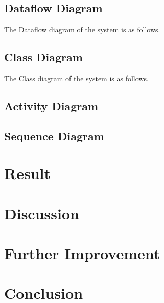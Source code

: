 \documentclass[a4paper,12pt,onepage]{article}
\begin{document}
\newpage
\subsection{Dataflow Diagram}
The Dataflow diagram of the system is as follows.

\newpage
\subsection{Class Diagram}\par
The Class diagram of the system is as follows.

\newpage
\subsection{Activity Diagram}
\newpage
\subsection{Sequence Diagram}
\newpage

\section{Result}

\section{Discussion}

\newpage
\section{Further Improvement}

\newpage
\section{Conclusion}

\newpage


\nocite{*}
\end{document}
